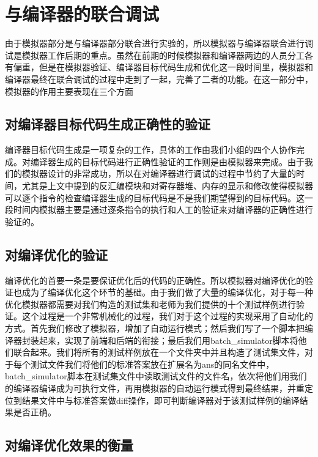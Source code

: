 \documentclass[12pt,a4paper]{article}
\begin{document}
\section{与编译器的联合调试}

由于模拟器部分是与编译器部分联合进行实验的，所以模拟器与编译器联合进行调试是模拟器工作后期的重点。虽然在前期的时候模拟器和编译器两边的人员分工各有偏重，但是在模拟器验证、编译器目标代码生成和优化这一段时间里，模拟器和编译器最终在联合调试的过程中走到了一起，完善了二者的功能。在这一部分中，模拟器的作用主要表现在三个方面

\subsection{对编译器目标代码生成正确性的验证}

编译器目标代码生成是一项复杂的工作，具体的工作由我们小组的四个人协作完成。对编译器生成的目标代码进行正确性验证的工作则是由模拟器来完成。由于我们的模拟器设计的非常成功，所以在对编译器进行调试的过程中节约了大量的时间，尤其是上文中提到的反汇编模块和对寄存器堆、内存的显示和修改使得模拟器可以逐个指令的检查编译器生成的目标代码是不是我们期望得到的目标代码。这一段时间内模拟器主要是通过逐条指令的执行和人工的验证来对编译器的正确性进行验证的。

\subsection{对编译优化的验证}

编译优化的首要一条是要保证优化后的代码的正确性。所以模拟器对编译优化的验证也成为了编译优化这个环节的基础。由于我们做了大量的编译优化，对于每一种优化模拟器都需要对我们构造的测试集和老师为我们提供的十个测试样例进行验证。这个过程是一个非常机械化的过程，我们对于这个过程的实现采用了自动化的方式。首先我们修改了模拟器，增加了自动运行模式；然后我们写了一个脚本把编译器封装起来，实现了前端和后端的衔接；最后我们用batch\_simulator脚本将他们联合起来。我们将所有的测试样例放在一个文件夹中并且构造了测试集文件，对于每个测试文件我们将他们的标准答案放在扩展名为ans的同名文件中，batch\_simulator脚本在测试集文件中读取测试文件的文件名，依次将他们用我们的编译器编译成为可执行文件，再用模拟器的自动运行模式得到最终结果，并重定位到结果文件中与标准答案做diff操作，即可判断编译器对于该测试样例的编译结果是否正确。

\subsection{对编译优化效果的衡量}
\end{document}
